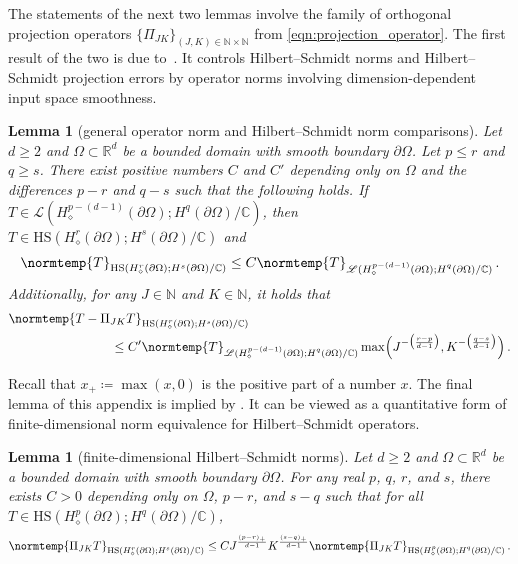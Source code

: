 \documentclass[pdflatex,sn-mathphys-num]{sn-jnl-preprint}
\newcommand{\N}{\mathbb{N}}
\newcommand{\R}{\mathbb{R}}
\newcommand{\C}{\mathbb{C}}
\newcommand{\sL}{\mathscr{L}}
\newcommand{\pOmega}{{\partial\Omega}}
\newcommand{\norm}{\normtemp}
\newcommand{\defeq}{\coloneqq} %
\newcommand{\HS}{\mathrm{HS}} %
\theoremstyle{thmstyleone}%
\newtheorem{lemma}[theorem]{Lemma}%
\theoremstyle{thmstyletwo}%
\theoremstyle{thmstylethree}%
\numberwithin{equation}{section}
\numberwithin{theorem}{section}
\begin{document}
\begin{appendices}
The statements of the next two lemmas involve the family of orthogonal projection operators $\{\Pi_{JK}\}_{(J,K)\in\N\times\N}$ from \eqref{eqn:projection_operator}. The first result of the two is due to~\cite[Lemma~18, p. 195]{abraham2019statistical}. It controls Hilbert--Schmidt norms and Hilbert--Schmidt projection errors by operator norms involving dimension-dependent input space smoothness.
\begin{lemma}[general operator norm and Hilbert--Schmidt norm comparisons]\label{lem:op_to_hs_rn}
    Let $d\geq 2$ and $\Omega\subset \R^d$ be a bounded domain with smooth boundary $\pOmega$. 
	Let $p\leq r$ and $q\geq s$. There exist positive numbers $C$ and $C'$ depending only on $\Omega$ and the differences $p-r$ and $q-s$ such that the following holds. If $T\in\sL(H^{p-(d-1)}_\diamond(\pOmega);H_{\phantom{\diamond}}^q(\pOmega)/\C)$, then $T\in\HS(H^r_\diamond(\pOmega);H^s(\pOmega)/\C)$ and
	\begin{align}
		\norm{T}_{\HS(H^r_\diamond(\pOmega);H^s(\pOmega)/\C)}\leq C \norm{T}_{\sL(H^{p-(d-1)}_\diamond(\pOmega);H_{\phantom{\diamond}}^q(\pOmega)/\C)}\,.
	\end{align}
    Additionally, for any $J\in\N$ and $K\in\N$, it holds that
	\begin{align}
		&\norm{T-\Pi_{JK}T}_{\HS(H^r_\diamond(\pOmega);H^s(\pOmega)/\C)}\\
        &\qquad\qquad\qquad\qquad \leq C' \norm{T}_{\sL(H^{p-(d-1)}_\diamond(\pOmega);H_{\phantom{\diamond}}^q(\pOmega)/\C)}\max\Bigl(J^{-\bigl(\frac{r-p}{d-1}\bigr)}, K^{-\bigl(\frac{q-s}{d-1}\bigr)}\Bigr)\,.\notag
    \end{align}
\end{lemma}

Recall that $x_+\defeq\max(x,0)$ is the positive part of a number $x$. The final lemma of this appendix is implied by \cite[Lemma~17, p.~195]{abraham2019statistical}. It can be viewed as a quantitative form of finite-dimensional norm equivalence for Hilbert--Schmidt operators.
\begin{lemma}[finite-dimensional Hilbert--Schmidt norms]\label{lem:ntd_norm_equiv}
    Let $d\geq 2$ and $\Omega\subset \R^d$ be a bounded domain with smooth boundary $\pOmega$. For any real $p$, $q$, $r$, and $s$, there exists $C>0$ depending only on $\Omega$, $p-r$, and $s-q$ such that for all $T\in\HS(H^p_\diamond(\pOmega);H_{\phantom{\diamond}}^q(\pOmega)/\C)$,
	\begin{align}
    \norm{\Pi_{JK}T}_{\HS(H_\diamond^r(\pOmega);H_{\phantom{\diamond}}^s(\pOmega)/\C)}\leq C J^{\frac{(p-r)_+}{d-1}}K^{\frac{(s-q)_+}{d-1}}\norm{\Pi_{JK}T}_{\HS(H_\diamond^p(\pOmega);H_{\phantom{\diamond}}^q(\pOmega)/\C)}\,.
	\end{align}
\end{lemma}



\end{appendices}
\end{document}
